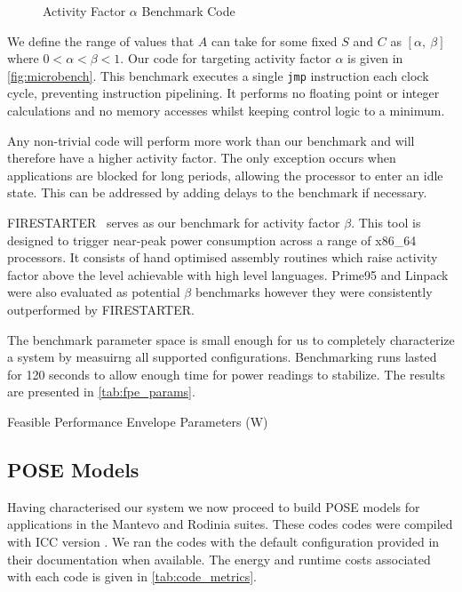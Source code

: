 \begin{figure}[ht]
\centering
\lstset{basicstyle=\ttfamily\footnotesize\bfseries, frame=tb} %

\caption{Activity Factor $\alpha$ Benchmark Code}
\label{fig:microbench}
\end{figure}

We define the range of values that $A$ can take for some fixed $S$ and $C$ as $[\alpha,~\beta]$ where $0 < \alpha < \beta < 1$.
Our code for targeting activity factor $\alpha$ is given in \autoref{fig:microbench}.
This benchmark executes a single \texttt{jmp} instruction each clock cycle, preventing instruction pipelining.
It performs no floating point or integer calculations and no memory accesses whilst keeping control logic to a minimum.

Any non-trivial code will perform more work than our benchmark and will therefore have a higher activity factor.
The only exception occurs when applications are blocked for long periods, allowing the processor to enter an idle state.
This can be addressed by adding delays to the benchmark if necessary.

FIRESTARTER~\cite{hackenberg:2013ab} serves as our benchmark for activity factor $\beta$.
This tool is designed to trigger near-peak power consumption across a range of x86\_64 processors.
It consists of hand optimised assembly routines which raise activity factor above the level achievable with high level languages.
Prime95 and Linpack were also evaluated as potential $\beta$ benchmarks however they were consistently outperformed by FIRESTARTER.

The benchmark parameter space is small enough for us to completely characterize a system by measuirng all supported configurations.
Benchmarking runs lasted for 120 seconds to allow enough time for power readings to stabilize.
The results are presented in \autoref{tab:fpe_params}.

\begin{table}
\centering
\caption{Feasible Performance Envelope Parameters (W)}
\label{tab:fpe_params}

\end{table}

\subsection{POSE Models}

Having characterised our system we now proceed to build POSE models for applications in the Mantevo and Rodinia suites.
These codes codes were compiled with ICC version .
We ran the codes with the default configuration provided in their documentation when available.
The energy and runtime costs associated with each code is given in \autoref{tab:code_metrics}.

